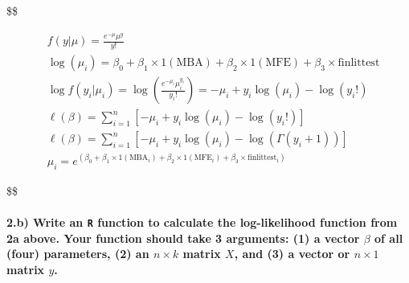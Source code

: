 \documentclass[
  letterpaper,
  DIV=11,
  numbers=noendperiod]{scrartcl}
\let\oldparagraph\paragraph
\renewcommand{\paragraph}[1]{\oldparagraph{#1}\mbox{}}
\begin{document}
\$\$

\begin{align}
& f(y|\mu) = \frac{e^{-\mu} \mu^y}{y!} \\
& \log(\mu_i) = \beta_0 + \beta_1 \times 1(\text{MBA}) + \beta_2 \times 1(\text{MFE}) + \beta_3 \times \text{finlittest} \\
& \log f(y_i | \mu_i) = \log \left( \frac{e^{-\mu_i} \mu_i^{y_i}}{y_i!} \right) = -\mu_i + y_i \log(\mu_i) - \log(y_i!) \\
& \ell(\beta) = \sum_{i=1}^{n} \left[ -\mu_i + y_i \log(\mu_i) - \log(y_i!) \right] \\
& \ell(\beta) = \sum_{i=1}^{n} \left[ -\mu_i + y_i \log(\mu_i) - \log(\Gamma(y_i + 1)) \right] \\
& \mu_i = e^{(\beta_0 + \beta_1 \times 1(\text{MBA}_i) + \beta_2 \times 1(\text{MFE}_i) + \beta_3 \times \text{finlittest}_i)}
\end{align}

\$\$

\hypertarget{b-write-an-r-function-to-calculate-the-log-likelihood-function-from-2a-above.-your-function-should-take-3-arguments-1-a-vector-beta-of-all-four-parameters-2-an-n-times-k-matrix-x-and-3-a-vector-or-n-times-1-matrix-y.}{%
\paragraph{\texorpdfstring{2.b) Write an \texttt{R} function to
calculate the log-likelihood function from 2a above. Your function
should take 3 arguments: (1) a vector \(\beta\) of all (four)
parameters, (2) an \(n \times k\) matrix \(X\), and (3) a vector or
\(n \times 1\) matrix
\(y\).}{2.b) Write an R function to calculate the log-likelihood function from 2a above. Your function should take 3 arguments: (1) a vector \textbackslash beta of all (four) parameters, (2) an n \textbackslash times k matrix X, and (3) a vector or n \textbackslash times 1 matrix y.}}\label{b-write-an-r-function-to-calculate-the-log-likelihood-function-from-2a-above.-your-function-should-take-3-arguments-1-a-vector-beta-of-all-four-parameters-2-an-n-times-k-matrix-x-and-3-a-vector-or-n-times-1-matrix-y.}}
\end{document}
